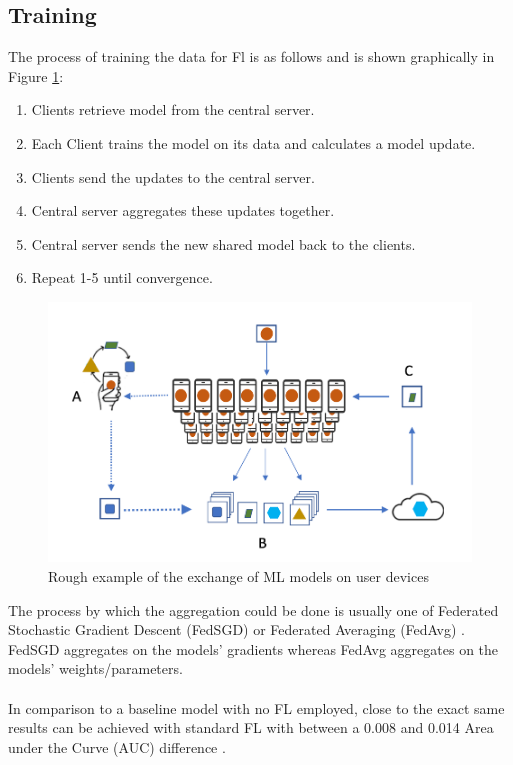 \subsection{Training}
The process of training the data for Fl is as follows and is shown graphically in Figure \ref{fig:federated_learning}:
\begin{enumerate}
    \item Clients retrieve model from the central server.
    
    \item Each Client trains the model on its data and calculates a model update.
    
    \item Clients send the updates to the central server.
    
    \item Central server aggregates these updates together.
    
    \item Central server sends the new shared model back to the clients.
    
    \item Repeat 1-5 until convergence.
\end{enumerate}
\begin{figure}[htbp]
	\centering
    \includegraphics[scale=0.3]{background/federated_learning.png}
	\caption{Rough example of the exchange of ML models on user devices \cite{federated_learning}}
	\label{fig:federated_learning}
\end{figure}
The process by which the aggregation could be done is usually one of Federated Stochastic Gradient Descent (FedSGD) \cite{fedsgd} or Federated Averaging (FedAvg) \cite{fedavg}.
FedSGD aggregates on the models' gradients whereas FedAvg aggregates on the models' weights/parameters. \\ \\
In comparison to a baseline model with no FL employed, close to the exact same results can be achieved with standard FL with between a 0.008 and 0.014 Area under the Curve (AUC) difference \cite{babu}.


